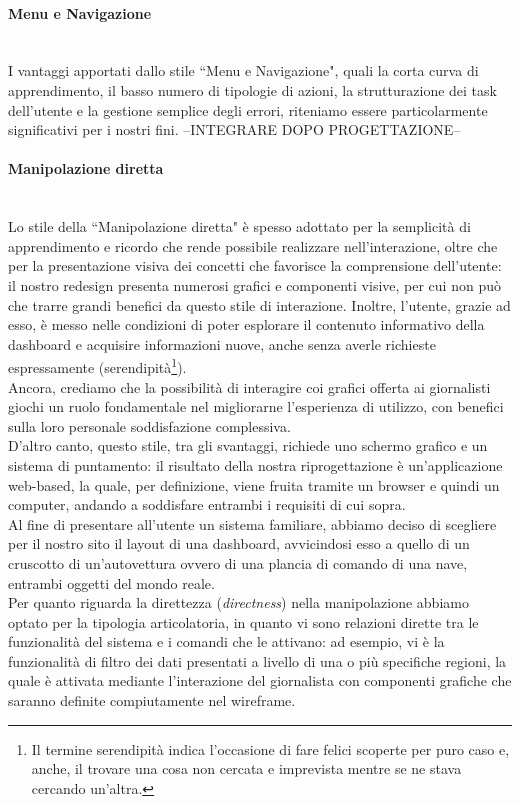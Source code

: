\paragraph{Menu e Navigazione}\mbox{}\\
I vantaggi apportati dallo stile ``Menu e Navigazione", quali la corta curva di apprendimento, il basso numero di tipologie di azioni, la strutturazione dei task dell'utente e la gestione semplice degli errori, riteniamo essere particolarmente significativi per i nostri fini.
--INTEGRARE DOPO PROGETTAZIONE--

\paragraph{Manipolazione diretta}\mbox{}\\
Lo stile della ``Manipolazione diretta" è spesso adottato per la semplicità di apprendimento e ricordo che rende possibile realizzare nell'interazione, oltre che per la presentazione visiva dei concetti che favorisce la comprensione dell'utente: il nostro redesign presenta numerosi grafici e componenti visive, per cui non può che trarre grandi benefici da questo stile di interazione. Inoltre, l'utente, grazie ad esso, è messo nelle condizioni di poter esplorare il contenuto informativo della dashboard e acquisire informazioni nuove, anche senza averle richieste espressamente (serendipità\footnote{Il termine serendipità indica l'occasione di fare felici scoperte per puro caso e, anche, il trovare una cosa non cercata e imprevista mentre se ne stava cercando un'altra.}).\\
Ancora, crediamo che la possibilità di interagire coi grafici offerta ai giornalisti giochi un ruolo fondamentale nel migliorarne l'esperienza di utilizzo, con benefici sulla loro personale soddisfazione complessiva.\\
D'altro canto, questo stile, tra gli svantaggi, richiede uno schermo grafico e un sistema di puntamento: il risultato della nostra riprogettazione è un'applicazione web-based, la quale, per definizione, viene fruita tramite un browser e quindi un computer, andando a soddisfare entrambi i requisiti di cui sopra.\\
Al fine di presentare all'utente un sistema familiare, abbiamo deciso di scegliere per il nostro sito il layout di una dashboard, avvicindosi esso a quello di un cruscotto di un'autovettura ovvero di una plancia di comando di una nave, entrambi oggetti del mondo reale.\\
Per quanto riguarda la direttezza (\textit{directness}) nella manipolazione abbiamo optato per la tipologia articolatoria, in quanto vi sono relazioni dirette tra le funzionalità del sistema e i comandi che le attivano: ad esempio, vi è la funzionalità di filtro dei dati presentati a livello di una o più specifiche regioni, la quale è attivata mediante l'interazione del giornalista con componenti grafiche che saranno definite compiutamente nel wireframe.

